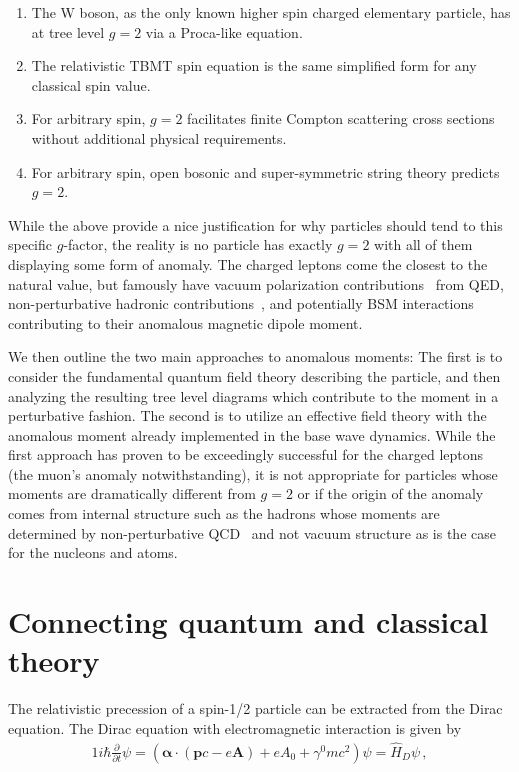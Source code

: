\begin{enumerate}[nosep]
	\item The W boson, as the only known higher spin charged elementary particle, has at tree level $g=2$ via a Proca-like equation.
	\item The relativistic TBMT spin equation is the same simplified form for any classical spin value.
	\item For arbitrary spin, $g=2$ facilitates finite Compton scattering cross sections without additional physical requirements.
	\item For arbitrary spin, open bosonic and super-symmetric string theory predicts $g=2$.
\end{enumerate}
While the above provide a nice justification for why particles should tend to this specific $g$-factor, the reality is no particle has exactly $g=2$ with all of them displaying some form of anomaly. The charged leptons come the closest to the natural value, but famously have vacuum polarization contributions~\citep{Schwinger:1951nm} from QED, non-perturbative hadronic contributions~\citep{Jegerlehner:2017gek}, and potentially BSM interactions~\citep{Knecht:2003kc} contributing to their anomalous magnetic dipole moment.

We then outline the two main approaches to anomalous moments: The first is to consider the fundamental quantum field theory describing the particle, and then analyzing the resulting tree level diagrams which contribute to the moment in a perturbative fashion. The second is to utilize an effective field theory with the anomalous moment already implemented in the base wave dynamics. While the first approach has proven to be exceedingly successful for the charged leptons (the muon's anomaly notwithstanding), it is not appropriate for particles whose moments are dramatically different from $g=2$ or if the origin of the anomaly comes from internal structure such as the hadrons whose moments are determined by non-perturbative QCD~\citep{Eichmann:2016yit,Pacetti:2014jai} and not vacuum structure as is the case for the nucleons and atoms.

\section{Connecting quantum and classical theory}
\label{sec:ehrenfest}
\noindent The relativistic precession of a spin-1/2 particle can be extracted from the Dirac equation. The Dirac equation with electromagnetic interaction is given by
\begin{alignat}{1}
  \label{DIRAC01} i\hbar\frac{\partial}{\partial t}\psi=\left(\boldsymbol{\alpha}\cdot\left(\mathbf{p}c-e\mathbf{A}\right)+eA_{0}+\gamma^{0}mc^{2}\right)\psi=\hat{H}_{D}\psi\,,
\end{alignat}

